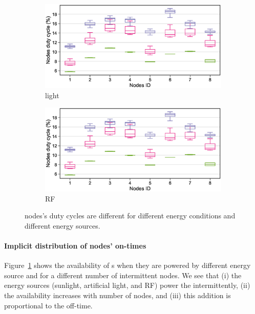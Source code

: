 
\begin{figure}[t]
		\begin{subfigure}{\columnwidth}
			\centering
			\includegraphics[width=\textwidth]{figures/natural_light_nodes_duty_cycles}
				\caption{light}
		\end{subfigure}\hfill
		\begin{subfigure}{\columnwidth}
			\centering
			\includegraphics[width=\textwidth]{figures/natural_light_nodes_duty_cycles}
				\caption{ RF}
		\end{subfigure}
		\caption{nodes's duty cycles are different for different energy conditions and different energy sources.}
		\label{fig:pwrCIS}
\end{figure} 

\paragraph{Implicit distribution of nodes' on-times}
Figure~\ref{fig:pwrCIS} shows the availability of \sys{}s when they are powered by different energy source and for a different number of intermittent nodes. We see that (i) the energy sources (sunlight, artificial light, and RF) power the \sys intermittently, (ii) the \sys availability increases with number of nodes, and (iii) this addition is proportional to the \sys off-time. 

